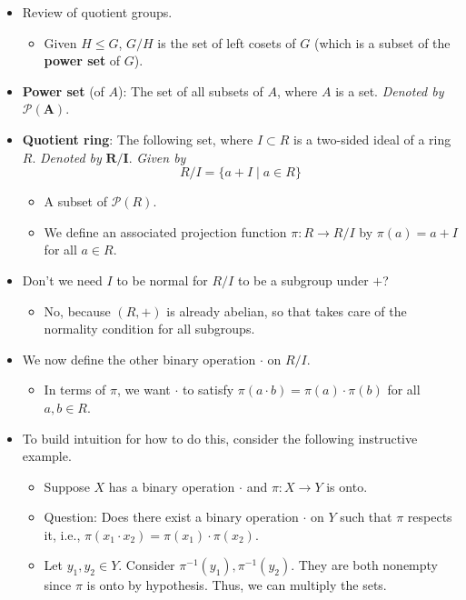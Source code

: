 \documentclass[../notes.tex]{subfiles}
\begin{document}
\begin{itemize}
\begin{itemize}
    \end{itemize}
    \item Review of quotient groups.
    \begin{itemize}
        \item Given $H\leq G$, $G/H$ is the set of left cosets of $G$ (which is a subset of the \textbf{power set} of $G$).
    \end{itemize}
    \item \textbf{Power set} (of $A$): The set of all subsets of $A$, where $A$ is a set. \emph{Denoted by} $\bm{\mathcal{P}(A)}$.
    \item \textbf{Quotient ring}: The following set, where $I\subset R$ is a two-sided ideal of a ring $R$. \emph{Denoted by} $\bm{R/I}$. \emph{Given by}
    \begin{equation*}
        R/I = \{a+I\mid a\in R\}
    \end{equation*}
    \begin{itemize}
        \item A subset of $\mathcal{P}(R)$.
        \item We define an associated projection function $\pi:R\to R/I$ by $\pi(a)=a+I$ for all $a\in R$.
    \end{itemize}
    \item Don't we need $I$ to be normal for $R/I$ to be a subgroup under $+$?
    \begin{itemize}
        \item No, because $(R,+)$ is already abelian, so that takes care of the normality condition for all subgroups.
    \end{itemize}
    \item We now define the other binary operation $\cdot$ on $R/I$.
    \begin{itemize}
        \item In terms of $\pi$, we want $\cdot$ to satisfy $\pi(a\cdot b)=\pi(a)\cdot\pi(b)$ for all $a,b\in R$.
    \end{itemize}
    \item To build intuition for how to do this, consider the following instructive example.
    \begin{itemize}
        \item Suppose $X$ has a binary operation $\cdot$ and $\pi:X\to Y$ is onto.
        \item Question: Does there exist a binary operation $\cdot$ on $Y$ such that $\pi$ respects it, i.e., $\pi(x_1\cdot x_2)=\pi(x_1)\cdot\pi(x_2)$.
        \item Let $y_1,y_2\in Y$. Consider $\pi^{-1}(y_1),\pi^{-1}(y_2)$. They are both nonempty since $\pi$ is onto by hypothesis. Thus, we can multiply the sets.

\end{itemize}
\end{itemize}
\end{document}
